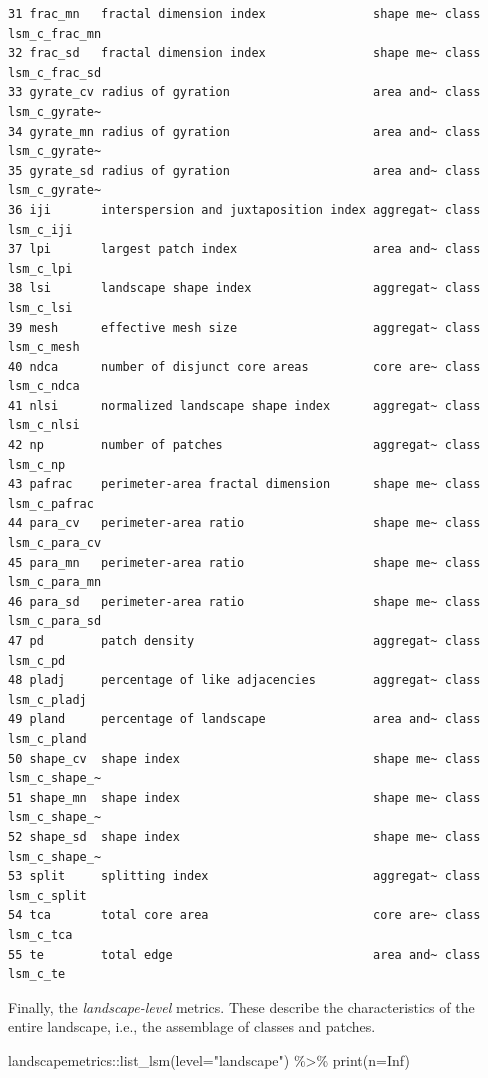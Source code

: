 \documentclass[
  letterpaper,
  DIV=11,
  numbers=noendperiod]{scrartcl}
\newenvironment{Shaded}{\begin{snugshade}}{\end{snugshade}}
\newcommand{\AttributeTok}[1]{\textcolor[rgb]{0.40,0.45,0.13}{#1}}
\newcommand{\ConstantTok}[1]{\textcolor[rgb]{0.56,0.35,0.01}{#1}}
\newcommand{\FunctionTok}[1]{\textcolor[rgb]{0.28,0.35,0.67}{#1}}
\newcommand{\NormalTok}[1]{\textcolor[rgb]{0.00,0.23,0.31}{#1}}
\newcommand{\SpecialCharTok}[1]{\textcolor[rgb]{0.37,0.37,0.37}{#1}}
\newcommand{\StringTok}[1]{\textcolor[rgb]{0.13,0.47,0.30}{#1}}
\begin{document}
\begin{verbatim}
31 frac_mn   fractal dimension index               shape me~ class lsm_c_frac_mn
32 frac_sd   fractal dimension index               shape me~ class lsm_c_frac_sd
33 gyrate_cv radius of gyration                    area and~ class lsm_c_gyrate~
34 gyrate_mn radius of gyration                    area and~ class lsm_c_gyrate~
35 gyrate_sd radius of gyration                    area and~ class lsm_c_gyrate~
36 iji       interspersion and juxtaposition index aggregat~ class lsm_c_iji    
37 lpi       largest patch index                   area and~ class lsm_c_lpi    
38 lsi       landscape shape index                 aggregat~ class lsm_c_lsi    
39 mesh      effective mesh size                   aggregat~ class lsm_c_mesh   
40 ndca      number of disjunct core areas         core are~ class lsm_c_ndca   
41 nlsi      normalized landscape shape index      aggregat~ class lsm_c_nlsi   
42 np        number of patches                     aggregat~ class lsm_c_np     
43 pafrac    perimeter-area fractal dimension      shape me~ class lsm_c_pafrac 
44 para_cv   perimeter-area ratio                  shape me~ class lsm_c_para_cv
45 para_mn   perimeter-area ratio                  shape me~ class lsm_c_para_mn
46 para_sd   perimeter-area ratio                  shape me~ class lsm_c_para_sd
47 pd        patch density                         aggregat~ class lsm_c_pd     
48 pladj     percentage of like adjacencies        aggregat~ class lsm_c_pladj  
49 pland     percentage of landscape               area and~ class lsm_c_pland  
50 shape_cv  shape index                           shape me~ class lsm_c_shape_~
51 shape_mn  shape index                           shape me~ class lsm_c_shape_~
52 shape_sd  shape index                           shape me~ class lsm_c_shape_~
53 split     splitting index                       aggregat~ class lsm_c_split  
54 tca       total core area                       core are~ class lsm_c_tca    
55 te        total edge                            area and~ class lsm_c_te     
\end{verbatim}

Finally, the \emph{landscape-level} metrics. These describe the
characteristics of the entire landscape, i.e., the assemblage of classes
and patches.

\begin{Shaded}
\begin{Highlighting}[]
\NormalTok{landscapemetrics}\SpecialCharTok{::}\FunctionTok{list\_lsm}\NormalTok{(}\AttributeTok{level=}\StringTok{"landscape"}\NormalTok{) }\SpecialCharTok{\%\textgreater{}\%} \FunctionTok{print}\NormalTok{(}\AttributeTok{n=}\ConstantTok{Inf}\NormalTok{)}
\end{Highlighting}
\end{Shaded}
\end{document}

